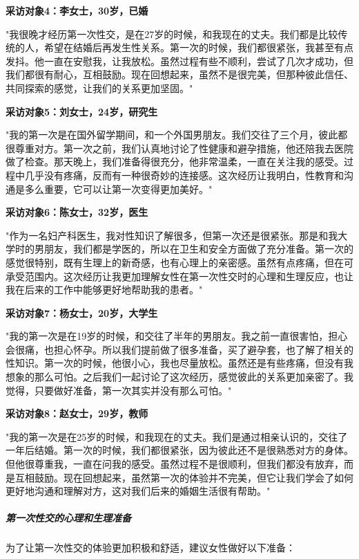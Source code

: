 \documentclass[12pt,UTF8]{ctexbook}
\begin{document}
\textbf{采访对象4：李女士，30岁，已婚}

"我很晚才经历第一次性交，是在27岁的时候，和我现在的丈夫。我们都是比较传统的人，希望在结婚后再发生性关系。第一次的时候，我们都很紧张，我甚至有点发抖。他一直在安慰我，让我放松。虽然过程有些不顺利，尝试了几次才成功，但我们都很有耐心，互相鼓励。现在回想起来，虽然不是很完美，但那种彼此信任、共同探索的感觉，让我们的关系更加坚固。"

\textbf{采访对象5：刘女士，24岁，研究生}

"我的第一次是在国外留学期间，和一个外国男朋友。我们交往了三个月，彼此都很尊重对方。第一次之前，我们认真地讨论了性健康和避孕措施，他还陪我去医院做了检查。那天晚上，我们准备得很充分，他非常温柔，一直在关注我的感受。过程中几乎没有疼痛，反而有一种很奇妙的连接感。这次经历让我明白，性教育和沟通是多么重要，它可以让第一次变得更加美好。"

\textbf{采访对象6：陈女士，32岁，医生}

"作为一名妇产科医生，我对性知识了解很多，但第一次还是很紧张。那是和我大学时的男朋友，我们都是学医的，所以在卫生和安全方面做了充分准备。第一次的感觉很特别，既有生理上的新奇感，也有心理上的亲密感。虽然有点疼痛，但在可承受范围内。这次经历让我更加理解女性在第一次性交时的心理和生理反应，也让我在后来的工作中能够更好地帮助我的患者。"

\textbf{采访对象7：杨女士，20岁，大学生}

"我的第一次是在19岁的时候，和交往了半年的男朋友。我之前一直很害怕，担心会很痛，也担心怀孕。所以我们提前做了很多准备，买了避孕套，也了解了相关的性知识。第一次的时候，他很小心，我也尽量放松。虽然还是有些疼痛，但没有我想象的那么可怕。之后我们一起讨论了这次经历，感觉彼此的关系更加亲密了。我觉得，只要做好准备，第一次其实并没有那么可怕。"

\textbf{采访对象8：赵女士，29岁，教师}

"我的第一次是在25岁的时候，和我现在的丈夫。我们是通过相亲认识的，交往了一年后结婚。第一次的时候，我们都很紧张，因为彼此还不是很熟悉对方的身体。但他很尊重我，一直在问我的感受。虽然过程不是很顺利，但我们都没有放弃，而是互相鼓励。现在回想起来，虽然第一次的体验并不完美，但它让我们学会了如何更好地沟通和理解对方，这对我们后来的婚姻生活很有帮助。"

\subparagraph{第一次性交的心理和生理准备}

为了让第一次性交的体验更加积极和舒适，建议女性做好以下准备：
\end{document}
